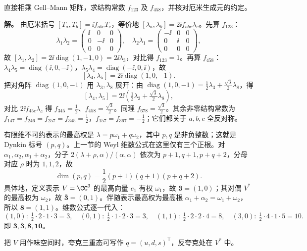 \begin{example}[当场算出两个结构常数]
直接相乘 Gell--Mann 矩阵，求结构常数 $f_{123}$ 及 $f_{458}$，并核对厄米生成元的约定。

\textbf{解。} 由厄米括号 $[T_a,T_b]=\ii f_{abc}T_c$，等价地 $[\lambda_a,\lambda_b]=2\ii f_{abc}\lambda_c$。先算 $f_{123}$：
\[
\lambda_1\lambda_2=\begin{pmatrix}\ii&0&0\\0&-\ii&0\\0&0&0\end{pmatrix},\quad
\lambda_2\lambda_1=\begin{pmatrix}-\ii&0&0\\0&\ii&0\\0&0&0\end{pmatrix},
\]
故 $[\lambda_1,\lambda_2]=2\ii\operatorname{diag}(1,-1,0)=2\ii\lambda_3$，对比得 $f_{123}=1$。再算 $f_{458}$：$\lambda_4\lambda_5=\operatorname{diag}(\ii,0,-\ii)$，$\lambda_5\lambda_4=\operatorname{diag}(-\ii,0,\ii)$，故
\[
[\lambda_4,\lambda_5]=2\ii\operatorname{diag}(1,0,-1).
\]
把对角阵 $\operatorname{diag}(1,0,-1)$ 用 $\lambda_3,\lambda_8$ 展开：由 $\operatorname{diag}(1,0,-1)=\tfrac12\lambda_3+\tfrac{\sqrt3}{2}\lambda_8$，得
\[
[\lambda_4,\lambda_5]=2\ii\left(\tfrac12\lambda_3+\tfrac{\sqrt3}{2}\lambda_8\right),
\]
对比 $2\ii f_{45c}\lambda_c$ 得 $f_{345}=\tfrac12$、$f_{458}=\tfrac{\sqrt3}{2}$。同理 $f_{678}=\tfrac{\sqrt3}{2}$。其余非零结构常数为 $f_{147}=f_{246}=f_{257}=f_{345}=\tfrac12$，$f_{157}=f_{367}=-\tfrac12$；它们都关于 $a,b,c$ 全反对称。
\end{example}

\begin{corollary}[$SU(3)$ 不可约表示的标号与维数]
有限维不可约表示的最高权是 $\lambda=p\omega_1+q\omega_2$，其中 $p,q$ 是非负整数；这就是 Dynkin 标号 $(p,q)$。上一节的 Weyl 维数公式在这里仅有三个正根。对 $\alpha_1,\alpha_2,\alpha_1+\alpha_2$，分子 $2(\lambda+\rho,\alpha)/(\alpha,\alpha)$ 依次为 $p+1,q+1,p+q+2$，分母对应 $\rho$ 时为 $1,1,2$，故
\[
\dim(p,q)=\frac12(p+1)(q+1)(p+q+2).
\]
具体地，定义表示 $V=\CC^3$ 的最高向量 $e_1$ 有权 $\omega_1$，故 $\mathbf3=(1,0)$；其对偶 $V^*$ 的最高权为 $\omega_2$，故 $\bar{\mathbf3}=(0,1)$。伴随表示最高权为最高根 $\alpha_1+\alpha_2=\omega_1+\omega_2$，所以 $\mathbf8=(1,1)$。维数公式逐一代入：
\[
(1,0):\ \tfrac12\cdot2\cdot1\cdot3=3,\quad
(0,1):\ \tfrac12\cdot1\cdot2\cdot3=3,\quad
(1,1):\ \tfrac12\cdot2\cdot2\cdot4=8,\quad
(3,0):\ \tfrac12\cdot4\cdot1\cdot5=10.
\]
即 $\mathbf3,\bar{\mathbf3},\mathbf8,\mathbf{10}$。
\end{corollary}
把 $V$ 用作味空间时，夸克三重态可写作 $q=(u,d,s)^{\mathsf T}$，反夸克处在 $V^*$ 中。

